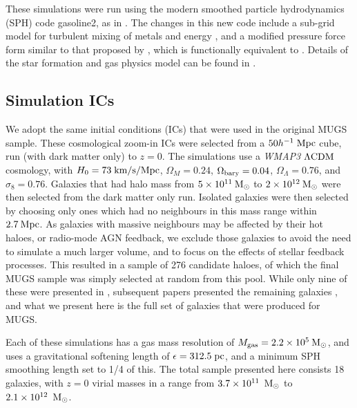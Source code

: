 These simulations were run using the modern smoothed particle hydrodynamics
(SPH) code {\sc gasoline2}, as in \citet{Keller2015,Keller2014}.
The changes in this new code include a sub-grid model for turbulent mixing of
metals and energy \citep{Shen2010}, and a modified pressure force form similar
to that proposed by \citet{Ritchie2001}, which is functionally equivalent to
\citet{Hopkins2013}.  Details of the star formation and gas physics model can be
found in \citet{Keller2014}.

\subsection{Simulation ICs}
We adopt the same initial conditions (ICs) that were used in the original
\citet{Stinson2010} MUGS sample.  These cosmological zoom-in ICs were selected
from a $50 h^{-1}\;\rm{Mpc}$ cube, run (with dark matter only) to $z=0$.  The
simulations use a {\it WMAP3} $\Lambda\rm{CDM}$ cosmology, with $H_0 =
73\;\rm{km/s/Mpc}$, $\Omega_M = 0.24$, $\Omega_{\rm bary} = 0.04$, $\Omega_\Lambda =
0.76$, and $\sigma_8 =0.76$.  Galaxies that had halo mass from
$5\times10^{11}\>{\rm M_{\odot}}$ to $2\times10^{12}\>{\rm M_{\odot}}$ were then selected from the
dark matter only run.  Isolated galaxies were then selected by choosing only
ones which had no neighbours in this mass range within $2.7\>{\rm Mpc}$.  As galaxies
with massive neighbours may be affected by their hot haloes, or radio-mode AGN
feedback, we exclude those galaxies to avoid the need to simulate a much larger
volume, and to focus on the effects of stellar feedback processes.  This
resulted in a sample of 276 candidate haloes, of which the final MUGS sample was
simply selected at random from this pool.  While only nine of these were presented
in \citet{Stinson2010}, subsequent papers presented the remaining galaxies
\citep{Bailin2010,Nickerson2011,Nickerson2013}, and what we present here is the
full set of galaxies that were produced for MUGS.

Each of these simulations has a gas mass resolution of
$M_{\rm gas}=2.2\times10^5\>{\rm M_{\odot}} $, and uses a gravitational softening length of
$\epsilon=312.5\; \rm{pc}$, and a minimum SPH smoothing length set to 1/4 of
this.  The total sample presented here consists 18 galaxies, with $z=0$ virial
masses in a range from $3.7\times10^{11}\;\>{\rm M_{\odot}}$ to $2.1\times10^{12}\;\>{\rm M_{\odot}}$.

